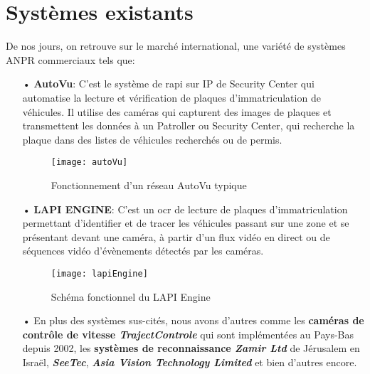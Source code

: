 \section{Systèmes existants}
De nos jours, on retrouve sur le marché international, une variété de systèmes ANPR commerciaux tels que:
    \begin{itemize}
        \item[•]\textbf{AutoVu}: C’est le système de \acrfull{rapi} sur IP de Security Center qui automatise la lecture et vérification de plaques d'immatriculation de véhicules. Il utilise des caméras qui capturent des images de plaques et transmettent les données à un Patroller ou Security Center, qui recherche la plaque dans des listes de véhicules recherchés ou de permis. \cite{autoVu}
            \begin{figure}[H]
                \centering
                \texttt{[image: autoVu]}
                \caption{Fonctionnement d'un réseau AutoVu typique}
            \end{figure}  
        \item[•]\textbf{LAPI ENGINE}: C’est un \acrshort{ocr} de lecture de plaques d'immatriculation permettant d'identifier et de tracer les véhicules passant sur une zone et se présentant devant une caméra, à partir d'un flux vidéo en direct ou de séquences vidéo d'évènements détectés par les caméras. \cite{lapiWeb}
        \begin{figure}[H]
            \centering
            \texttt{[image: lapiEngine]}
            \caption{Schéma fonctionnel du LAPI Engine \cite{lapiManual}}
        \end{figure} 
        \item[•] En plus des systèmes sus-cités, nous avons d'autres comme les \textbf{caméras de contrôle de vitesse \textit{TrajectControle}} qui sont implémentées au Pays-Bas depuis 2002, les \textbf{systèmes de reconnaissance \textit{Zamir Ltd}} de Jérusalem en Israël, \textbf{\textit{SeeTec}}, \textbf{\textit{Asia Vision Technology Limited}} et bien d'autres encore. \cite{HindeThesis, NorMaster}
    \end{itemize} 
    